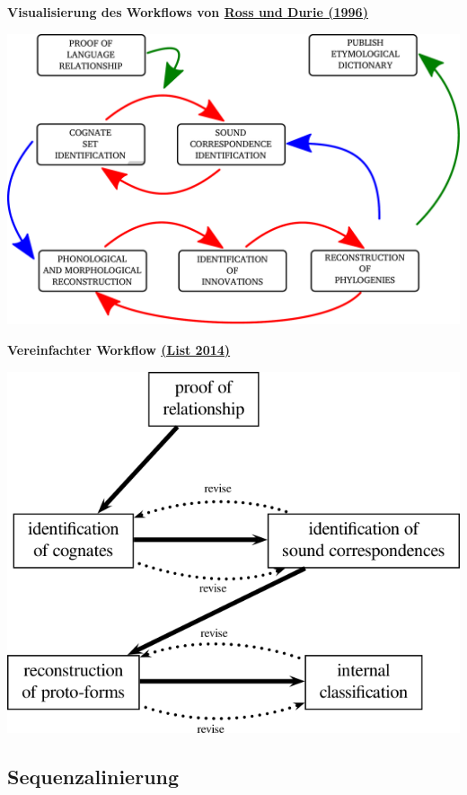 \par\noindent\textbf{Visualisierung des Workflows von
\href{http://bibliography.lingpy.org?key=Ross1996}{Ross und Durie
(1996)}}

\includegraphics[width=\textwidth]{img/ross-durie-workflow.pdf}



\par\noindent\textbf{Vereinfachter Workflow
\href{http://bibliography.lingpy.org?key=List2014d}{(List 2014)}}

\includegraphics[width=\textwidth]{img/cm-simplified.png}

\subsection{\texorpdfstring{{Sequenzalinierung}}{Sequenzalinierung}}

